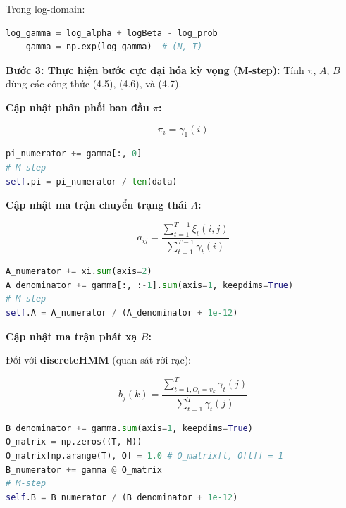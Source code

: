 \documentclass[twoside, final]{hcmut_report}
\begin{document}
Trong log-domain:

\begin{tcolorbox}
\begin{lstlisting}[language=Python]
    log_gamma = log_alpha + logBeta - log_prob
    gamma = np.exp(log_gamma)  # (N, T)
\end{lstlisting}
\end{tcolorbox}

\textbf{Bước 3: Thực hiện bước cực đại hóa kỳ vọng (M-step):} Tính $\pi$, $A$, $B$ dùng các công thức (4.5), (4.6), và (4.7).

\textbf{Cập nhật phân phối ban đầu $\pi$:}

\begin{equation}
\pi_i = \gamma_1(i) \tag{4.5}
\end{equation}

\begin{tcolorbox}
\begin{lstlisting}[language=Python]
pi_numerator += gamma[:, 0]
# M-step
self.pi = pi_numerator / len(data)
\end{lstlisting}
\end{tcolorbox}

\textbf{Cập nhật ma trận chuyển trạng thái $A$:}

\begin{equation}
a_{ij} = \frac{\sum_{t=1}^{T-1} \xi_t(i,j)}{\sum_{t=1}^{T-1} \gamma_t(i)} \tag{4.6}
\end{equation}

\begin{tcolorbox}
\begin{lstlisting}[language=Python]
A_numerator += xi.sum(axis=2)
A_denominator += gamma[:, :-1].sum(axis=1, keepdims=True)
# M-step
self.A = A_numerator / (A_denominator + 1e-12)
\end{lstlisting}
\end{tcolorbox}

\textbf{Cập nhật ma trận phát xạ $B$:}

Đối với \textbf{discreteHMM} (quan sát rời rạc):

\begin{equation}
b_j(k) = \frac{\sum_{t=1, O_t=v_k}^{T} \gamma_t(j)}{\sum_{t=1}^{T} \gamma_t(j)} \tag{4.7}
\end{equation}

\begin{tcolorbox}
\begin{lstlisting}[language=Python]
B_denominator += gamma.sum(axis=1, keepdims=True)
O_matrix = np.zeros((T, M))
O_matrix[np.arange(T), O] = 1.0 # O_matrix[t, O[t]] = 1
B_numerator += gamma @ O_matrix
# M-step
self.B = B_numerator / (B_denominator + 1e-12)
\end{lstlisting}
\end{tcolorbox}
\end{document}
